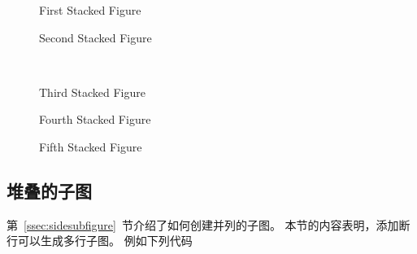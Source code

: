\begin{figure}[htbp]
	\centering
	\begin{minipage}[t]{0.25\linewidth}
		\centering
		\resizebox{\linewidth}{!}{\usebox{\boxgraphic}}
		\caption{First Stacked Figure}
		\label{fig:stacked:first}
	\end{minipage}%
	\hspace{1cm}%
	\begin{minipage}[t]{0.25\linewidth}
		\centering
		\resizebox{\linewidth}{!}{\usebox{\boxgraphic}}
		\caption{Second Stacked Figure}
		\label{fig:stacked:second}
	\end{minipage}\\[20pt]
	\begin{minipage}[t]{0.25\linewidth}
		\centering
		\resizebox{\linewidth}{!}{\usebox{\boxgraphic}}
		\caption{Third Stacked Figure}
		\label{fig:stacked:third}
	\end{minipage}%
	\hspace{1cm}%
	\begin{minipage}[t]{0.25\linewidth}
		\centering
		\resizebox{\linewidth}{!}{\usebox{\boxgraphic}}
		\caption{Fourth Stacked Figure}
		\label{fig:stacked:fourth}
	\end{minipage}%
	\hspace{1cm}%
	\begin{minipage}[t]{0.25\linewidth}
		\centering
		\resizebox{\linewidth}{!}{\usebox{\boxgraphic}}
		\caption{Fifth Stacked Figure}
		\label{fig:stacked:fifth}
	\end{minipage}%
\end{figure}

\subsection{堆叠的子图}\label{ssec:stackedsubfigs}

第~\ref{ssec:sidesubfigure}~节介绍了如何创建并列的子图。
本节的内容表明，添加断行可以生成多行子图。
例如下列代码


